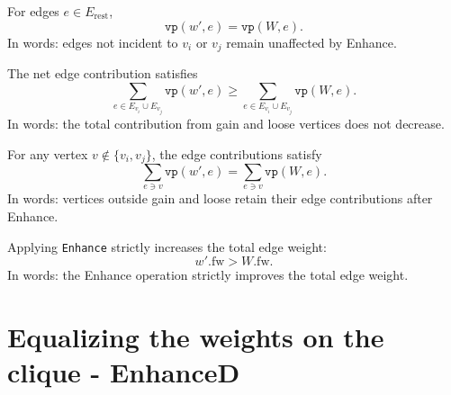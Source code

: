 \begin{lemma}
  \label{lem:Enhance_sum_complement_unchanged}
  \leanok
For edges \(e \in E_{\mathrm{rest}}\),
\[
\texttt{vp}(w', e) = \texttt{vp}(W, e).
\]
In words: edges not incident to \(v_i\) or \(v_j\) remain unaffected by Enhance.
\end{lemma}

\begin{lemma}
  \label{lem:Enhance_edge_gainloose_increase}
  \leanok
The net edge contribution satisfies
\[
\sum_{e \in E_{v_i} \cup E_{v_j}} \texttt{vp}(w', e) \geq \sum_{e \in E_{v_i} \cup E_{v_j}} \texttt{vp}(W, e).
\]
In words: the total contribution from gain and loose vertices does not decrease.
\end{lemma}

\begin{lemma}
  \label{lem:Enhance_support_edges_same}
  \leanok
For any vertex \(v \notin \{v_i, v_j\}\), the edge contributions satisfy
\[
\sum_{e \ni v} \texttt{vp}(w', e) = \sum_{e \ni v} \texttt{vp}(W, e).
\]
In words: vertices outside gain and loose retain their edge contributions after Enhance.
\end{lemma}

\begin{theorem}
  \label{thm:Enhance_total_weight_stricinc}
  \leanok
Applying \texttt{Enhance} strictly increases the total edge weight:
\[
w'.\mathrm{fw} > W.\mathrm{fw}.
\]
In words: the Enhance operation strictly improves the total edge weight.
\end{theorem}

\section{Equalizing the weights on the clique - EnhanceD}

